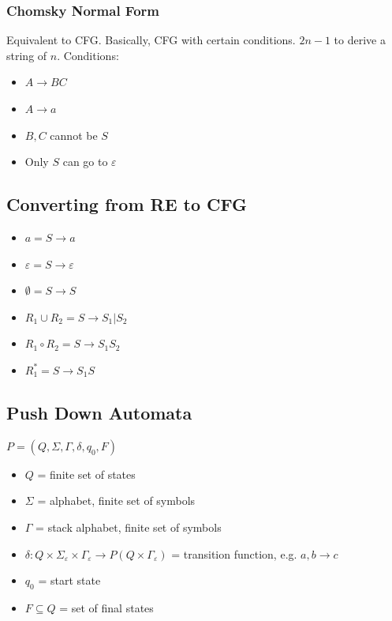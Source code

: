 \documentclass{article}
\begin{document}

\subsubsection{Chomsky Normal Form}
Equivalent to CFG. Basically, CFG with certain conditions. $2n-1$ to derive a string of $n$. Conditions:
\begin{itemize}
    \item $A \to BC$
    \item $A \to a$
    \item $B,C$ cannot be $S$
    \item Only $S$ can go to $\varepsilon$
\end{itemize}

\subsection{Converting from RE to CFG}
\begin{itemize}
    \item $a = S \to a$
    \item $\varepsilon = S \to \varepsilon$
    \item $\emptyset = S \to S$
    \item $R_1 \cup R_2 = S \to S_1 | S_2$
    \item $R_1 \circ R_2 = S \to S_1 S_2$
    \item $R_1^* = S \to S_1 S$
\end{itemize}

\subsection{Push Down Automata}
$P = (Q, \Sigma, \Gamma, \delta, q_0, F)$
\begin{itemize}
    \item $Q$ = finite set of states
    \item $\Sigma$ = alphabet, finite set of symbols
    \item $\Gamma$ = stack alphabet, finite set of symbols
    \item $\delta: Q \times \Sigma_{\varepsilon} \times \Gamma_{\varepsilon} \to P(Q\times \Gamma_{\varepsilon})$ = transition function, e.g. $a, b\to c$
    \item $q_0$ = start state
    \item $F \subseteq Q$ = set of final states
\end{itemize}
\end{document}
